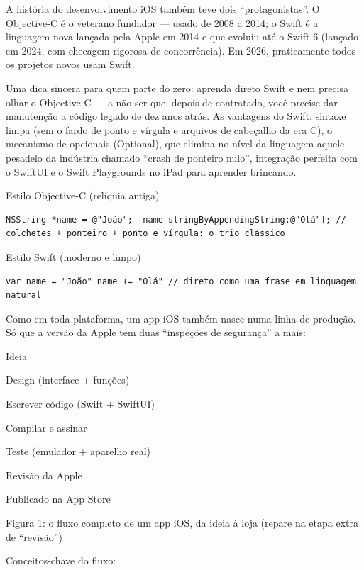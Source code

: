 A história do desenvolvimento iOS também teve dois “protagonistas”. O Objective-C é o veterano fundador — usado de 2008 a 2014; o Swift é a linguagem nova lançada pela Apple em 2014 e que evoluiu até o Swift 6 (lançado em 2024, com checagem rigorosa de concorrência). Em 2026, praticamente todos os projetos novos usam Swift.

Uma dica sincera para quem parte do zero: aprenda direto Swift e nem precisa olhar o Objective-C — a não ser que, depois de contratado, você precise dar manutenção a código legado de dez anos atrás. As vantagens do Swift: sintaxe limpa (sem o fardo de ponto e vírgula e arquivos de cabeçalho da era C), o mecanismo de opcionais (Optional), que elimina no nível da linguagem aquele pesadelo da indústria chamado “crash de ponteiro nulo”, integração perfeita com o SwiftUI e o Swift Playgrounds no iPad para aprender brincando.

Estilo Objective-C (relíquia antiga)

\begin{lstlisting}
NSString *name = @"João"; [name stringByAppendingString:@"Olá"]; // colchetes + ponteiro + ponto e vírgula: o trio clássico
\end{lstlisting}

Estilo Swift (moderno e limpo)

\begin{lstlisting}
var name = "João" name += "Olá" // direto como uma frase em linguagem natural
\end{lstlisting}


Como em toda plataforma, um app iOS também nasce numa linha de produção. Só que a versão da Apple tem duas “inspeções de segurança” a mais:

Ideia

Design (interface + funções)

Escrever código (Swift + SwiftUI)

Compilar e assinar

Teste (emulador + aparelho real)

Revisão da Apple

Publicado na App Store

\begin{center}\small\color{gray}Figura 1: o fluxo completo de um app iOS, da ideia à loja (repare na etapa extra de “revisão”)\end{center}

Conceitos-chave do fluxo:

